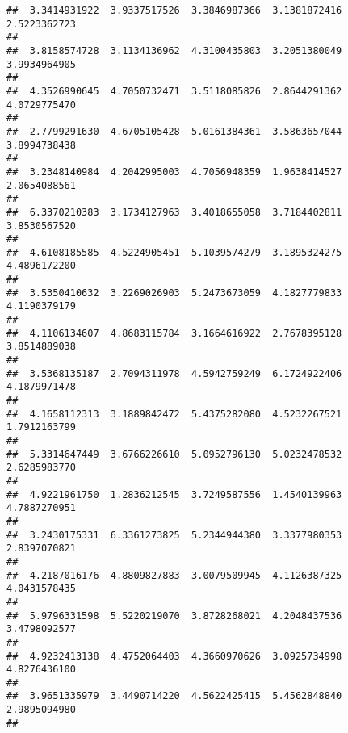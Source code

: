 \documentclass[]{article}
\begin{document}
\begin{verbatim}
##  3.3414931922  3.9337517526  3.3846987366  3.1381872416  2.5223362723 
##                                                                       
##  3.8158574728  3.1134136962  4.3100435803  3.2051380049  3.9934964905 
##                                                                       
##  4.3526990645  4.7050732471  3.5118085826  2.8644291362  4.0729775470 
##                                                                       
##  2.7799291630  4.6705105428  5.0161384361  3.5863657044  3.8994738438 
##                                                                       
##  3.2348140984  4.2042995003  4.7056948359  1.9638414527  2.0654088561 
##                                                                       
##  6.3370210383  3.1734127963  3.4018655058  3.7184402811  3.8530567520 
##                                                                       
##  4.6108185585  4.5224905451  5.1039574279  3.1895324275  4.4896172200 
##                                                                       
##  3.5350410632  3.2269026903  5.2473673059  4.1827779833  4.1190379179 
##                                                                       
##  4.1106134607  4.8683115784  3.1664616922  2.7678395128  3.8514889038 
##                                                                       
##  3.5368135187  2.7094311978  4.5942759249  6.1724922406  4.1879971478 
##                                                                       
##  4.1658112313  3.1889842472  5.4375282080  4.5232267521  1.7912163799 
##                                                                       
##  5.3314647449  3.6766226610  5.0952796130  5.0232478532  2.6285983770 
##                                                                       
##  4.9221961750  1.2836212545  3.7249587556  1.4540139963  4.7887270951 
##                                                                       
##  3.2430175331  6.3361273825  5.2344944380  3.3377980353  2.8397070821 
##                                                                       
##  4.2187016176  4.8809827883  3.0079509945  4.1126387325  4.0431578435 
##                                                                       
##  5.9796331598  5.5220219070  3.8728268021  4.2048437536  3.4798092577 
##                                                                       
##  4.9232413138  4.4752064403  4.3660970626  3.0925734998  4.8276436100 
##                                                                       
##  3.9651335979  3.4490714220  4.5622425415  5.4562848840  2.9895094980 
##                                                                       

\end{verbatim}
\end{document}
